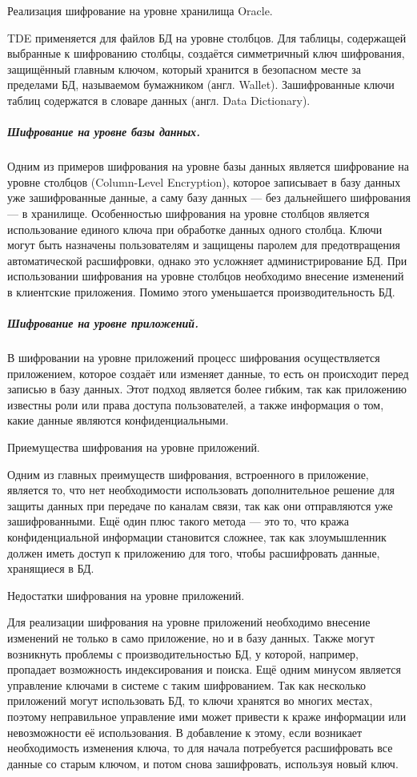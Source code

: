 Реализация шифрование на уровне хранилища Oracle.

TDE применяется для файлов БД на уровне столбцов. Для таблицы, содержащей выбранные к шифрованию
столбцы, создаётся симметричный ключ шифрования, защищённый главным ключом, который хранится в
безопасном месте за пределами БД, называемом бумажником (англ. Wallet). Зашифрованные ключи таблиц
содержатся в словаре данных (англ. Data Dictionary).

\subparagraph{Шифрование на уровне базы данных.}
Одним из примеров шифрования на уровне базы данных является шифрование на уровне столбцов
(Column-Level Encryption), которое записывает в базу данных уже зашифрованные данные, а саму базу
данных — без дальнейшего шифрования — в хранилище. Особенностью шифрования на уровне столбцов
является использование единого ключа при обработке данных одного столбца. Ключи могут быть
назначены пользователям и защищены паролем для предотвращения автоматической расшифровки, однако
это усложняет администрирование БД. При использовании шифрования на уровне столбцов необходимо
внесение изменений в клиентские приложения. Помимо этого уменьшается производительность БД.

\subparagraph{Шифрование на уровне приложений.}
В шифровании на уровне приложений процесс шифрования осуществляется приложением, которое создаёт
или изменяет данные, то есть он происходит перед записью в базу данных. Этот подход является более
гибким, так как приложению известны роли или права доступа пользователей, а также информация о том,
какие данные являются конфиденциальными.

Приемущества шифрования на уровне приложений.

Одним из главных преимуществ шифрования, встроенного в приложение, является то, что нет
необходимости использовать дополнительное решение для защиты данных при передаче по каналам связи,
так как они отправляются уже зашифрованными. Ещё один плюс такого метода — это то, что кража
конфиденциальной информации становится сложнее, так как злоумышленник должен иметь доступ к
приложению для того, чтобы расшифровать данные, хранящиеся в БД.

Недостатки шифрования на уровне приложений.

Для реализации шифрования на уровне приложений необходимо внесение изменений не только в само
приложение, но и в базу данных. Также могут возникнуть проблемы с производительностью БД, у
которой, например, пропадает возможность индексирования и поиска. Ещё одним минусом является
управление ключами в системе с таким шифрованием. Так как несколько приложений могут использовать
БД, то ключи хранятся во многих местах, поэтому неправильное управление ими может привести к краже
информации или невозможности её использования. В добавление к этому, если возникает необходимость
изменения ключа, то для начала потребуется расшифровать все данные со старым ключом, и потом снова
зашифровать, используя новый ключ.


